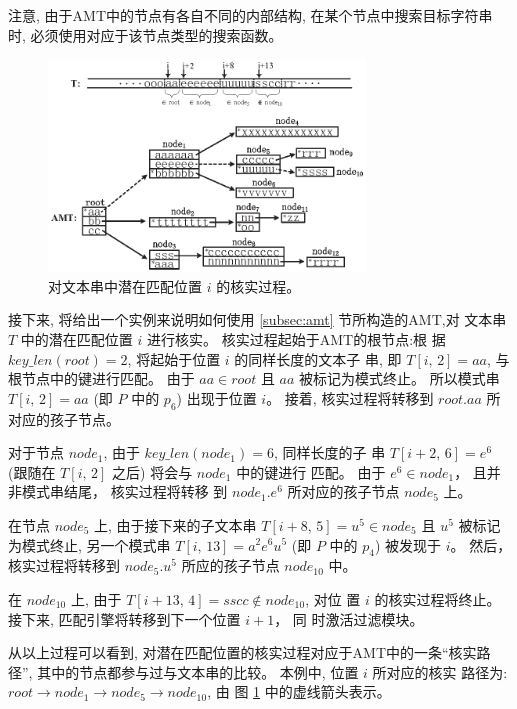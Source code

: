 注意, 由于AMT中的节点有各自不同的内部结构, 在某个节点中搜索目标字符串
时, 必须使用对应于该节点类型的搜索函数。

\begin{figure}[!h]
  \centering
  \includegraphics[width=0.75\textwidth]{figures/2_MPM/match}
  \caption{对文本串中潜在匹配位置 $i$ 的核实过程。}
  \label{fig:matching}
\end{figure}

接下来, 将给出一个实例来说明如何使用 \ref{subsec:amt} 节所构造的AMT,对
文本串 $T$ 中的潜在匹配位置 $i$ 进行核实。 核实过程起始于AMT的根节点:根
据 $key\_len(root)=2$, 将起始于位置 $i$ 的同样长度的文本子
串, 即 $T[i,\,2]=aa$, 与根节点中的键进行匹配。 由于 $aa \in
root$ 且 $aa$ 被标记为模式终止。 所以模式串 $T[i,\,2]=aa$
(即 $P$ 中的 $p_6$) 出现于位置 $i$。 接着, 核实过程将转移到 $root.aa$ 所
对应的孩子节点。

对于节点 $node_1$, 由于 $key\_len(node_1)=6$, 同样长度的子
串 $T[i+2,\,6]=e^6$ (跟随在 $T[i,\,2]$ 之后) 将会与 $node_1$ 中的键进行
匹配。 由于 $e^6 \in node_1$， 且并非模式串结尾， 核实过程将转移
到 $node_1.e^6$ 所对应的孩子节点 $node_5$ 上。

在节点 $node_5$ 上, 由于接下来的子文本串 $T[i+8,\,5]=u^5 \in
node_5$ 且 $u^5$ 被标记为模式终止, 另一个模式串 $T[i,\,13]=a^2e^6u^5$
(即 $P$ 中的 $p_4$) 被发现于 $i$。 然后，核实过程将转移到 $node_5.u^5$
所应的孩子节点 $node_{10}$ 中。

在 $node_{10}$ 上, 由于 $T[i+13,\,4]=sscc \notin node_{10}$, 对位
置 $i$ 的核实过程将终止。 接下来, 匹配引擎将转移到下一个位置 $i+1$， 同
时激活过滤模块。

从以上过程可以看到, 对潜在匹配位置的核实过程对应于AMT中的一条“核实路
径”, 其中的节点都参与过与文本串的比较。 本例中, 位置 $i$ 所对应的核实
路径为:
$root \rightarrow node_1 \rightarrow node_5 \rightarrow node_{10}$, 由
图 \ref{fig:matching} 中的虚线箭头表示。


